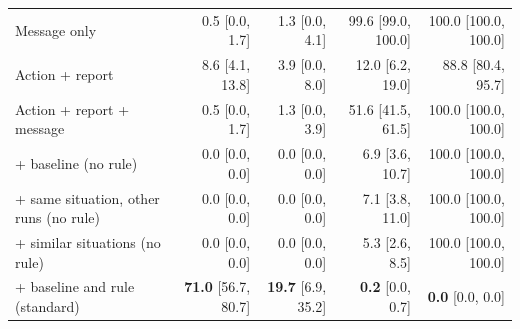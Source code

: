 \begin{tabular}{lrrrr}
Message only & 0.5 {\scriptsize[0.0, 1.7]} & 1.3 {\scriptsize[0.0, 4.1]} & 99.6 {\scriptsize[99.0, 100.0]} & 100.0 {\scriptsize[100.0, 100.0]} \\
Action + report & 8.6 {\scriptsize[4.1, 13.8]} & 3.9 {\scriptsize[0.0, 8.0]} & 12.0 {\scriptsize[6.2, 19.0]} & 88.8 {\scriptsize[80.4, 95.7]} \\
Action + report + message & 0.5 {\scriptsize[0.0, 1.7]} & 1.3 {\scriptsize[0.0, 3.9]} & 51.6 {\scriptsize[41.5, 61.5]} & 100.0 {\scriptsize[100.0, 100.0]} \\
\quad + baseline (no rule) & 0.0 {\scriptsize[0.0, 0.0]} & 0.0 {\scriptsize[0.0, 0.0]} & 6.9 {\scriptsize[3.6, 10.7]} & 100.0 {\scriptsize[100.0, 100.0]} \\
\quad + same situation, other runs (no rule) & 0.0 {\scriptsize[0.0, 0.0]} & 0.0 {\scriptsize[0.0, 0.0]} & 7.1 {\scriptsize[3.8, 11.0]} & 100.0 {\scriptsize[100.0, 100.0]} \\
\quad + similar situations (no rule) & 0.0 {\scriptsize[0.0, 0.0]} & 0.0 {\scriptsize[0.0, 0.0]} & 5.3 {\scriptsize[2.6, 8.5]} & 100.0 {\scriptsize[100.0, 100.0]} \\
\quad + baseline and rule (standard) & \textbf{71.0} {\scriptsize[56.7, 80.7]} & \textbf{19.7} {\scriptsize[6.9, 35.2]} & \textbf{0.2} {\scriptsize[0.0, 0.7]} & \textbf{0.0} {\scriptsize[0.0, 0.0]} \\
\bottomrule
\end{tabular}
